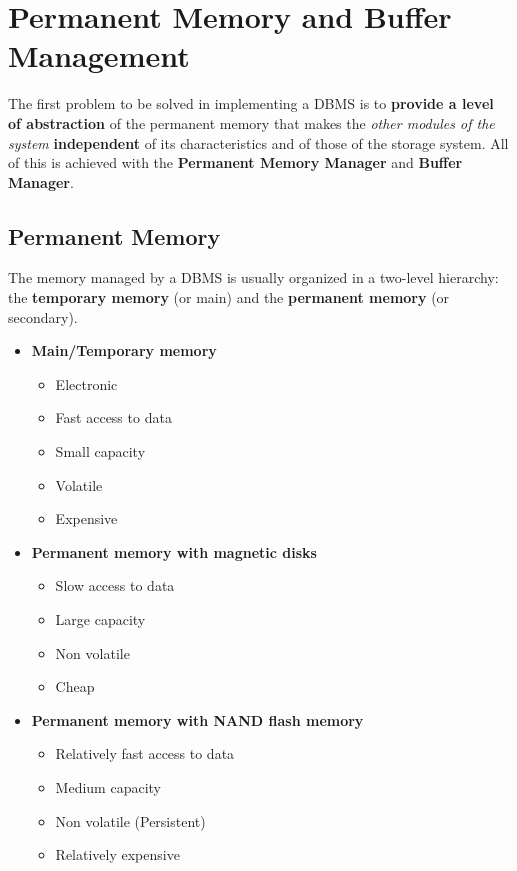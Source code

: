 \chapter{Permanent Memory and Buffer Management}
The first problem to be solved in implementing a DBMS is to \textbf{provide a level of abstraction} of the permanent memory that makes the \textit{other modules of the system} \textbf{independent} of its characteristics and of those of the storage system. All of this is achieved with the \textbf{Permanent Memory Manager} and \textbf{Buffer Manager}.

\section{Permanent Memory}
The memory managed by a DBMS is usually organized in a two-level hierarchy: the \textbf{temporary memory} (or main) and the \textbf{permanent memory} (or secondary).
\begin{itemize}
    \item \textbf{Main/Temporary memory}
    \begin{itemize}
        \item Electronic
        \item Fast access to data
        \item Small capacity
        \item Volatile
        \item Expensive
    \end{itemize}
    \item \textbf{Permanent memory with magnetic disks}
    \begin{itemize}
        \item Slow access to data
        \item Large capacity
        \item Non volatile
        \item Cheap
    \end{itemize}
    \item \textbf{Permanent memory with NAND flash memory}
    \begin{itemize}
        \item Relatively fast access to data 
        \item Medium capacity
        \item Non volatile (Persistent)
        \item Relatively expensive
    \end{itemize}
\end{itemize}
